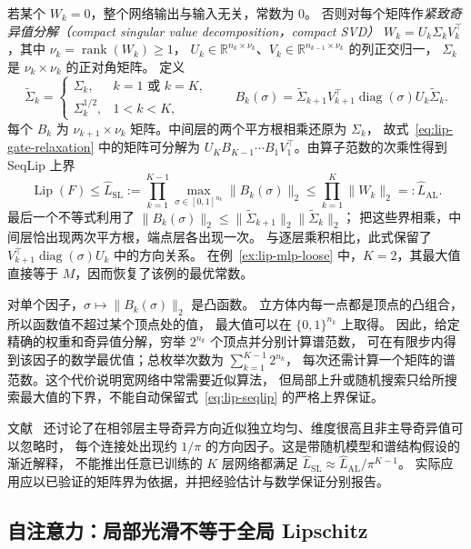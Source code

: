\documentclass[UTF8,12pt,a4paper,fontset=fandol]{ctexart}
\begin{document}
若某个 $W_k=0$，整个网络输出与输入无关，常数为 $0$。
否则对每个矩阵作\emph{紧致奇异值分解（compact singular value decomposition，compact SVD）}
$W_k=U_k\Sigma_kV_k^\top$，其中 $\nu_k=\operatorname{rank}(W_k)\ge1$，
$U_k\in\mathbb R^{n_k\times \nu_k}$、$V_k\in\mathbb R^{n_{k-1}\times \nu_k}$ 的列正交归一，
$\Sigma_k$ 是 $\nu_k\times \nu_k$ 的正对角矩阵。
定义
\[
  \widetilde\Sigma_k=
  \begin{cases}
    \Sigma_k,&k=1\text{ 或 }k=K,\\
    \Sigma_k^{1/2},&1<k<K,
  \end{cases}
  \qquad
  B_k(\sigma)=\widetilde\Sigma_{k+1}V_{k+1}^\top
    \operatorname{diag}(\sigma)U_k\widetilde\Sigma_k.
\]
每个 $B_k$ 为 $\nu_{k+1}\times \nu_k$ 矩阵。中间层的两个平方根相乘还原为 $\Sigma_k$，
故式~\eqref{eq:lip-gate-relaxation} 中的矩阵可分解为
$U_KB_{K-1}\cdots B_1V_1^\top$。由算子范数的次乘性得到 SeqLip 上界
\begin{equation}\label{eq:lip-seqlip}
  \operatorname{Lip}(F)\le
  \widehat L_{\mathrm{SL}}
  :=\prod_{k=1}^{K-1}\max_{\sigma\in[0,1]^{n_k}}\|B_k(\sigma)\|_2
  \le\prod_{k=1}^{K}\|W_k\|_2
  =:\widehat L_{\mathrm{AL}}.
\end{equation}
最后一个不等式利用了
$\|B_k(\sigma)\|_2\le\|\widetilde\Sigma_{k+1}\|_2\|\widetilde\Sigma_k\|_2$；
把这些界相乘，中间层恰出现两次平方根，端点层各出现一次。
与逐层乘积相比，此式保留了 $V_{k+1}^\top\operatorname{diag}(\sigma)U_k$ 中的方向关系。
在例~\ref{ex:lip-mlp-loose} 中，$K=2$，其最大值直接等于 $M$，因而恢复了该例的最优常数。

对单个因子，$\sigma\mapsto\|B_k(\sigma)\|_2$ 是凸函数。
立方体内每一点都是顶点的凸组合，所以函数值不超过某个顶点处的值，
最大值可以在 $\{0,1\}^{n_k}$ 上取得。
因此，给定精确的权重和奇异值分解，穷举 $2^{n_k}$ 个顶点并分别计算谱范数，
可在有限步内得到该因子的数学最优值；总枚举次数为 $\sum_{k=1}^{K-1}2^{n_k}$，
每次还需计算一个矩阵的谱范数。这个代价说明宽网络中常需要近似算法，
但局部上升或随机搜索只给所搜索最大值的下界，不能自动保留式~\eqref{eq:lip-seqlip} 的严格上界保证。

文献~\cite{scaman-virmaux} 还讨论了在相邻层主导奇异方向近似独立均匀、维度很高且非主导奇异值可以忽略时，
每个连接处出现约 $1/\pi$ 的方向因子。这是带随机模型和谱结构假设的渐近解释，
不能推出任意已训练的 $K$ 层网络都满足
$\widehat L_{\mathrm{SL}}\approx\widehat L_{\mathrm{AL}}/\pi^{K-1}$。
实际应用应以已验证的矩阵界为依据，并把经验估计与数学保证分别报告。

\subsection{自注意力：局部光滑不等于全局 Lipschitz}
\label{subsec:lip-attention}
\end{document}
